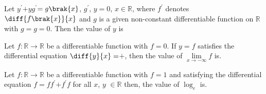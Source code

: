 \iffalse
\title{Assignment 2 - EE1030}
\author{ee24btech11018 - D. Swaraj Sharma}
\section{integer}
\fi
	\item Let $y^{\prime}$$+y$$g^{\prime}$$=g\brak{x}$, $g^{\prime}$, $y$$=0$, $x\in\mathbb{R}$, where $f^{\prime}$ denotes $\diff{{f\brak{x}}}{x}$ and $g$ is a given non-constant differentiable function on $\mathbb{R}$ with $g$$=g$$=0$. Then the value of $y$ is 
		
		\hfill{}
\item Let $f:\mathbb{R}\to\mathbb{R}$ be a differentiable function with $f$$=0$. If $y=f$ satisfies the differential equation $\diff{y}{x}=$$+$, then the value of $\lim\limits_{x\to-\infty}f$ is. 
	
	\hfill{}
	\item Let $f:\mathbb{R}\to\mathbb{R}$ be a differentiable function with $f$$=1$ and satisfying the differential equation $f$$=f$$f^{\prime}$$+f^{\prime}$$f$ for all $x$, $y$ $\in \mathbb{R}$ then, the value of $\log_e$  is. 
	
		\hfill{}
